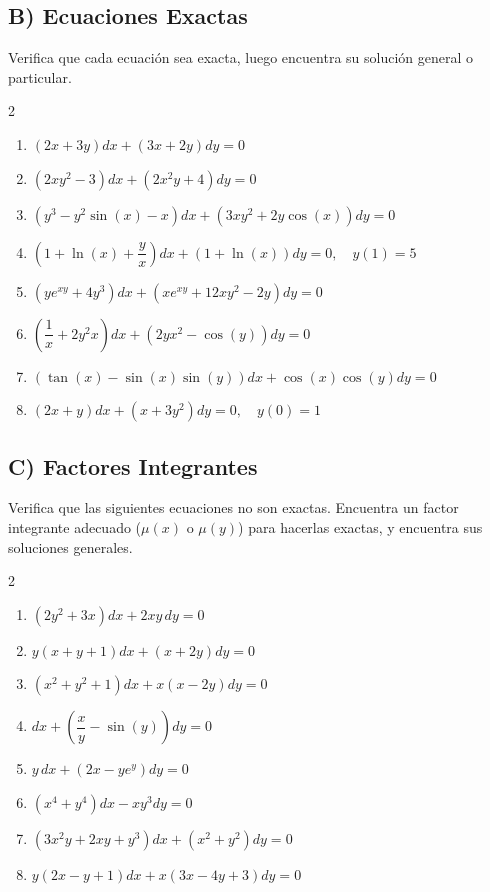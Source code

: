 \documentclass[a4paper,11pt]{article}
\begin{document}
\subsection*{B) Ecuaciones Exactas}
Verifica que cada ecuación sea exacta, luego encuentra su solución general o particular.

\begin{multicols}{2}
\begin{enumerate}[itemsep=0.1cm]
    \item $(2x + 3y)dx + (3x + 2y)dy = 0$
    \item $(2xy^2 - 3)dx + (2x^2y + 4)dy = 0$
    \item $(y^3 - y^2\sin(x) - x)dx + (3xy^2 + 2y\cos(x))dy = 0$
    \item $\left(1 + \ln(x) + \dfrac{y}{x}\right)dx + \left(1 + \ln(x)\right)dy = 0, \quad y(1) = 5$
    \item $\left(y e^{xy} + 4y^3\right)dx + \left(x e^{xy} + 12xy^2 - 2y\right)dy = 0$
    \item $\left(\dfrac{1}{x} + 2y^2 x\right)dx + \left(2y x^2 - \cos(y)\right)dy = 0$
    \item $\left(\tan(x) - \sin(x)\sin(y)\right)dx + \cos(x)\cos(y)dy = 0$
    \item $(2x + y)dx + (x + 3y^2)dy = 0, \quad y(0) = 1$
\end{enumerate}
\end{multicols}

\subsection*{C) Factores Integrantes}
Verifica que las siguientes ecuaciones no son exactas. Encuentra un factor integrante adecuado ($\mu(x)$ o $\mu(y)$) para hacerlas exactas, y encuentra sus soluciones generales.

\begin{multicols}{2}
\begin{enumerate}[itemsep=0.1cm]
    \item $(2y^2 + 3x)dx + 2xy\,dy = 0$
    \item $y(x + y + 1)dx + (x + 2y)dy = 0$
    \item $(x^2 + y^2 + 1)dx + x(x - 2y)dy = 0$
    \item $dx + \left(\dfrac{x}{y} - \sin(y)\right)dy = 0$
    \item $y\,dx + (2x - y e^y)dy = 0$
    \item $(x^4 + y^4)dx - x y^3 dy = 0$
    \item $\left(3x^2y + 2xy + y^3\right)dx + \left(x^2 + y^2\right)dy = 0$
    \item $y(2x-y+1)dx + x(3x-4y+3)dy = 0$
\end{enumerate}
\end{multicols}
\end{document}

